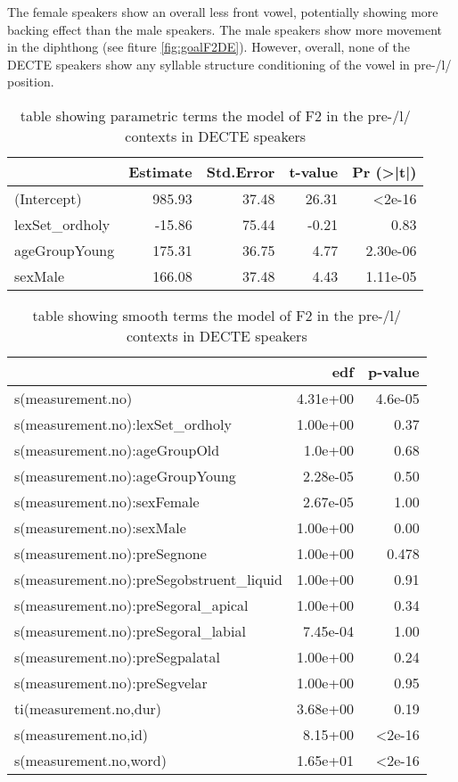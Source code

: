 \documentclass[../../../00.FullDoc/tex/Thesis]{subfiles}
\begin{document}
The female speakers show an overall less front vowel, potentially showing more backing effect than the male speakers. The male speakers show more movement in the diphthong (see fiture \ref{fig:goalF2DE}). However, overall, none of the DECTE speakers show any syllable structure conditioning of the \goat{} vowel in pre-/l/ position.

\begin{table}[htbp]
	\centering
	\begin{tabular}{lrrrr}
		\hline
		& Estimate & Std.Error & t-value & Pr (>|t|) \\
		\hline   
		(Intercept) & 985.93 & 37.48 & 26.31 & <2e-16 \\
		lexSet\_ordholy & -15.86 & 75.44 & -0.21 & 0.83 \\
		ageGroupYoung & 175.31 & 36.75 & 4.77 & 2.30e-06 \\
		sexMale & 166.08 & 37.48 & 4.43 & 1.11e-05 \\
		\hline
	\end{tabular}%
	\caption{table showing parametric terms the model of F2 in the pre-/l/ contexts in DECTE speakers}
	\label{tbl:goalF2DE-para}%
\end{table}%

\begin{table}[htbp]
	\centering
	\begin{tabular}{lrr}
		\hline
		& edf & p-value \\
		\hline
		s(measurement.no) & 4.31e+00 & 4.6e-05 \\
		s(measurement.no):lexSet\_ordholy & 1.00e+00 & 0.37 \\
		s(measurement.no):ageGroupOld & 1.0e+00 & 0.68 \\
		s(measurement.no):ageGroupYoung & 2.28e-05 & 0.50 \\
		s(measurement.no):sexFemale & 2.67e-05 & 1.00 \\
		s(measurement.no):sexMale & 1.00e+00 & 0.00 \\
		s(measurement.no):preSegnone & 1.00e+00 & 0.478 \\
		s(measurement.no):preSegobstruent\_liquid & 1.00e+00 & 0.91 \\
		s(measurement.no):preSegoral\_apical & 1.00e+00 & 0.34 \\
		s(measurement.no):preSegoral\_labial & 7.45e-04 & 1.00 \\
		s(measurement.no):preSegpalatal & 1.00e+00 & 0.24 \\
		s(measurement.no):preSegvelar & 1.00e+00 & 0.95 \\
		ti(measurement.no,dur) & 3.68e+00 & 0.19 \\
		s(measurement.no,id) & 8.15+00 & <2e-16 \\
		s(measurement.no,word) & 1.65e+01 & <2e-16 \\
		\hline
	\end{tabular}
	\caption{table showing smooth terms the model of F2 in the pre-/l/ contexts in DECTE speakers}
	\label{tbl:goalF2DE-smooth}%
\end{table}
\end{document}
